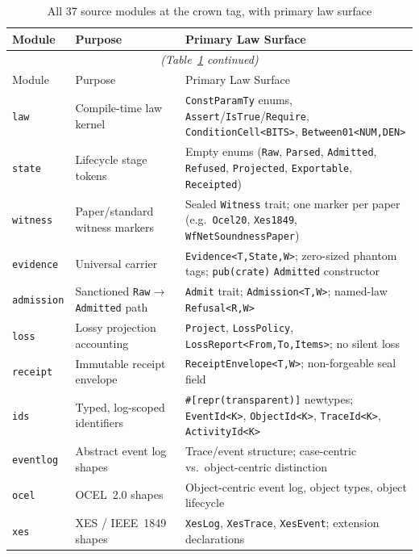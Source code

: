 \begin{longtable}{@{}lp{4.8cm}p{5.0cm}@{}}
\caption{All 37 source modules at the crown tag, with primary law surface}
\label{tab:modules}\\
\toprule
Module & Purpose & Primary Law Surface \\
\midrule
\endfirsthead
\multicolumn{3}{c}{\small\itshape (Table~\ref{tab:modules} continued)}\\
\toprule
Module & Purpose & Primary Law Surface \\
\midrule
\endhead
\bottomrule
\endlastfoot
\texttt{law}            & Compile-time law kernel & \texttt{ConstParamTy} enums, \texttt{Assert}/\texttt{IsTrue}/\texttt{Require}, \texttt{ConditionCell<BITS>}, \texttt{Between01<NUM,DEN>} \\
\texttt{state}          & Lifecycle stage tokens & Empty enums (\texttt{Raw}, \texttt{Parsed}, \texttt{Admitted}, \texttt{Refused}, \texttt{Projected}, \texttt{Exportable}, \texttt{Receipted}) \\
\texttt{witness}        & Paper/standard witness markers & Sealed \texttt{Witness} trait; one marker per paper (e.g.\ \texttt{Ocel20}, \texttt{Xes1849}, \texttt{WfNetSoundnessPaper}) \\
\texttt{evidence}       & Universal carrier & \texttt{Evidence<T,State,W>}; zero-sized phantom tags; \texttt{pub(crate)} \texttt{Admitted} constructor \\
\texttt{admission}      & Sanctioned \texttt{Raw}$\to$\texttt{Admitted} path & \texttt{Admit} trait; \texttt{Admission<T,W>}; named-law \texttt{Refusal<R,W>} \\
\texttt{loss}           & Lossy projection accounting & \texttt{Project}, \texttt{LossPolicy}, \texttt{LossReport<From,To,Items>}; no silent loss \\
\texttt{receipt}        & Immutable receipt envelope & \texttt{ReceiptEnvelope<T,W>}; non-forgeable seal field \\
\texttt{ids}            & Typed, log-scoped identifiers & \texttt{\#[repr(transparent)]} newtypes; \texttt{EventId<K>}, \texttt{ObjectId<K>}, \texttt{TraceId<K>}, \texttt{ActivityId<K>} \\
\texttt{eventlog}       & Abstract event log shapes & Trace/event structure; case-centric vs.\ object-centric distinction \\
\texttt{ocel}           & OCEL~2.0 shapes & Object-centric event log, object types, object lifecycle \\
\texttt{xes}            & XES / IEEE~1849 shapes & \texttt{XesLog}, \texttt{XesTrace}, \texttt{XesEvent}; extension declarations \\

\end{longtable}
